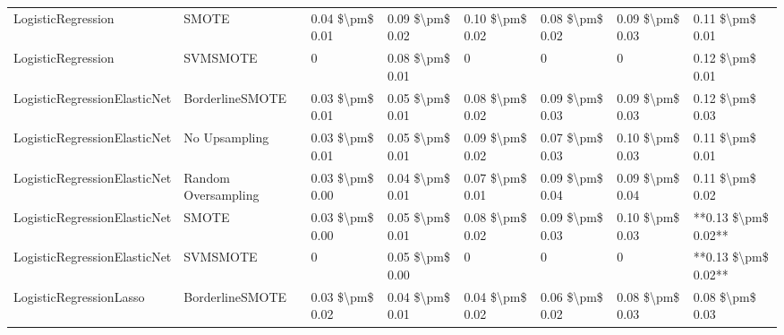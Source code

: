 \begin{tabular}{llllllll}
             LogisticRegression &                         SMOTE & 0.04 \$\textbackslash pm\$ 0.01 &           0.09 \$\textbackslash pm\$ 0.02 &       0.10 \$\textbackslash pm\$ 0.02 &        0.08 \$\textbackslash pm\$ 0.02 &                         0.09 \$\textbackslash pm\$ 0.03 &     0.11 \$\textbackslash pm\$ 0.01 \\
             LogisticRegression &                      SVMSMOTE &               0 &           0.08 \$\textbackslash pm\$ 0.01 &                     0 &                      0 &                                       0 &     0.12 \$\textbackslash pm\$ 0.01 \\
   LogisticRegressionElasticNet &               BorderlineSMOTE & 0.03 \$\textbackslash pm\$ 0.01 &           0.05 \$\textbackslash pm\$ 0.01 &       0.08 \$\textbackslash pm\$ 0.02 &        0.09 \$\textbackslash pm\$ 0.03 &                         0.09 \$\textbackslash pm\$ 0.03 &     0.12 \$\textbackslash pm\$ 0.03 \\
   LogisticRegressionElasticNet &                 No Upsampling & 0.03 \$\textbackslash pm\$ 0.01 &           0.05 \$\textbackslash pm\$ 0.01 &       0.09 \$\textbackslash pm\$ 0.02 &        0.07 \$\textbackslash pm\$ 0.03 &                         0.10 \$\textbackslash pm\$ 0.03 &     0.11 \$\textbackslash pm\$ 0.01 \\
   LogisticRegressionElasticNet &           Random Oversampling & 0.03 \$\textbackslash pm\$ 0.00 &           0.04 \$\textbackslash pm\$ 0.01 &       0.07 \$\textbackslash pm\$ 0.01 &        0.09 \$\textbackslash pm\$ 0.04 &                         0.09 \$\textbackslash pm\$ 0.04 &     0.11 \$\textbackslash pm\$ 0.02 \\
   LogisticRegressionElasticNet &                         SMOTE & 0.03 \$\textbackslash pm\$ 0.00 &           0.05 \$\textbackslash pm\$ 0.01 &       0.08 \$\textbackslash pm\$ 0.02 &        0.09 \$\textbackslash pm\$ 0.03 &                         0.10 \$\textbackslash pm\$ 0.03 & **0.13 \$\textbackslash pm\$ 0.02** \\
   LogisticRegressionElasticNet &                      SVMSMOTE &               0 &           0.05 \$\textbackslash pm\$ 0.00 &                     0 &                      0 &                                       0 & **0.13 \$\textbackslash pm\$ 0.02** \\
        LogisticRegressionLasso &               BorderlineSMOTE & 0.03 \$\textbackslash pm\$ 0.02 &           0.04 \$\textbackslash pm\$ 0.01 &       0.04 \$\textbackslash pm\$ 0.02 &        0.06 \$\textbackslash pm\$ 0.02 &                         0.08 \$\textbackslash pm\$ 0.03 &     0.08 \$\textbackslash pm\$ 0.03 \\

\end{tabular}
